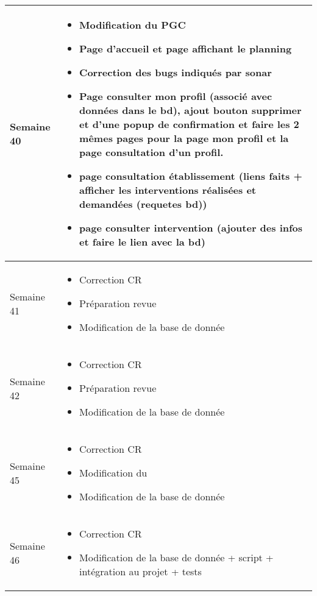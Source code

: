 \documentclass [a4paper] {article}
\begin{document}
\begin{longtable}{|>{\columncolor{gray!40}}p{2cm}|p{12cm}|}
	Semaine 40 & \begin{itemize}
	\item Modification du PGC
	\item Page d'accueil et page affichant le planning
	\item Correction des bugs indiqués par sonar
	\item Page consulter mon profil (associé avec données dans le bd), ajout bouton supprimer et d'une popup de confirmation et faire les 2 mêmes pages pour la page mon profil et la page consultation d'un profil. 
	\item page consultation établissement (liens faits + afficher les interventions réalisées et demandées (requetes bd))
	\item page consulter intervention (ajouter des infos et faire le lien avec la bd)
	\end{itemize} \\
	\hline
	
	Semaine 41 & \begin{itemize}
	\item Correction CR
	\item Préparation revue 
	\item Modification de la base de donnée
	\end{itemize} \\
	\hline

	Semaine 42 & \begin{itemize}
	\item Correction CR
	\item Préparation revue 
	\item Modification de la base de donnée
	\end{itemize} \\
	\hline

	Semaine 45 & \begin{itemize}
	\item Correction CR
	\item Modification du \PGC
	\item Modification de la base de donnée
	\end{itemize} \\
	\hline

	Semaine 46 & \begin{itemize}
	\item Correction CR
	\item Modification de la base de donnée + script + intégration au projet + tests
	\end{itemize} \\
	\hline
	
	
	
\end{longtable}
\end{document}
